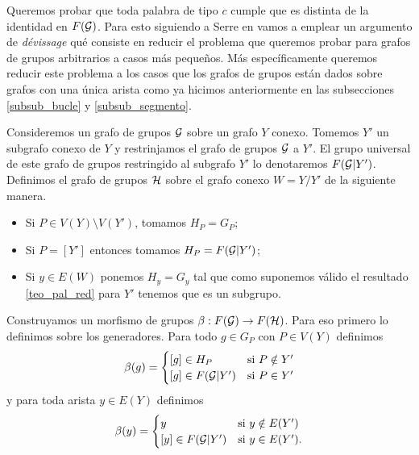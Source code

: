 \documentclass[tesis.tex]{subfiles}
\begin{document}
Queremos probar que toda palabra de tipo $c$ cumple que es distinta de la identidad en $F({\cal G})$. 
Para esto siguiendo a Serre en \cite{serre2002trees} vamos a emplear un argumento de \emph{dévissage} qué consiste en reducir el problema que queremos probar para grafos de grupos arbitrarios a casos más pequeños. 
Más específicamente queremos reducir este problema a los casos que los grafos de grupos están dados sobre grafos con una única arista como ya hicimos anteriormente en las subsecciones \ref{subsub_bucle} y \ref{subsub_segmento}.


\begin{deff}
	\label{deff:grafo_grupos_cociente}
	Consideremos un grafo de grupos ${\cal G}$ sobre un grafo $Y$ conexo. 
	Tomemos $Y'$ un subgrafo conexo de $Y$ y restrinjamos el grafo de grupos ${\cal G}$ a $Y'$. 
	El grupo universal de este grafo de grupos restringido al subgrafo $Y'$ lo denotaremos $F({\cal G} | Y')$.
	Definimos el grafo de grupos $\cal H$ sobre el grafo conexo $W=Y/Y'$ de la siguiente manera.
	\begin{itemize}
		\item Si $P \in V(Y) \setminus V(Y')$, tomamos $H_P = G_P$;
		\item Si $P = [Y']$ entonces tomamos $H_P = F({\cal G} | Y')$;
		\item Si $y \in E(W)$ ponemos $H_y = G_y$ tal que como suponemos válido el resultado \ref{teo_pal_red} para $Y'$ tenemos que es un subgrupo.
	\end{itemize}
\end{deff}

Construyamos un morfismo de grupos $\beta:F({\cal G}) \to F({\cal H})$.
Para eso primero lo definimos sobre los generadores.
Para todo $g \in G_P$ con $P \in V(Y)$ definimos
\begin{equation*}
	\beta(g) = 
	\begin{cases}
		[g] \in H_P & \text{si} \ P \notin Y' \\
		[g] \in F({\cal G} | Y') & \text{si} \ P \in Y'  \\ 
	\end{cases}
\end{equation*}
y para toda arista $ y \in E(Y)$ definimos
\begin{equation*}
	\beta(y) = 
	\begin{cases}
		y  & \text{si} \ y \notin E(Y') \\
		[y] \in F({\cal G} | Y') & \text{si} \ y \in E(Y').  \\ 
	\end{cases}
\end{equation*}
\end{document}
